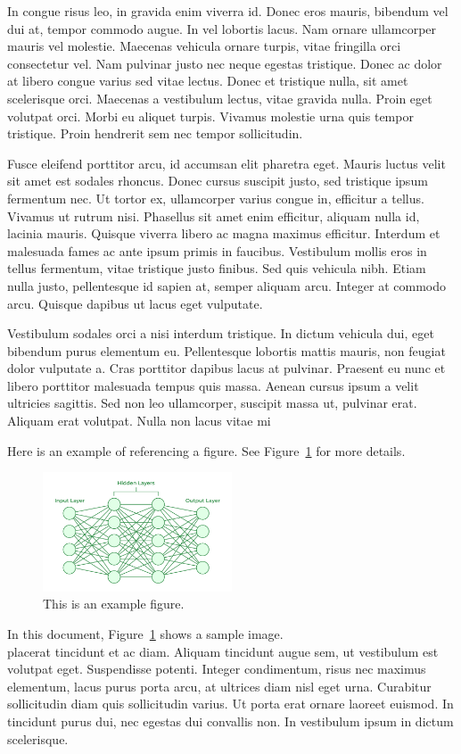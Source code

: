 \documentclass{article}
\begin{document}
In congue risus leo, in gravida enim viverra id. Donec eros mauris, bibendum vel dui at, tempor commodo augue. In vel lobortis lacus. Nam ornare ullamcorper mauris vel molestie. Maecenas vehicula ornare turpis, vitae fringilla orci consectetur vel. Nam pulvinar justo nec neque egestas tristique. Donec ac dolor at libero congue varius sed vitae lectus. Donec et tristique nulla, sit amet scelerisque orci. Maecenas a vestibulum lectus, vitae gravida nulla. Proin eget volutpat orci. Morbi eu aliquet turpis. Vivamus molestie urna quis tempor tristique. Proin hendrerit sem nec tempor sollicitudin.



Fusce eleifend porttitor arcu, id accumsan elit pharetra eget. Mauris luctus velit sit amet est sodales rhoncus. Donec cursus suscipit justo, sed tristique ipsum fermentum nec. Ut tortor ex, ullamcorper varius congue in, efficitur a tellus. Vivamus ut rutrum nisi. Phasellus sit amet enim efficitur, aliquam nulla id, lacinia mauris. Quisque viverra libero ac magna maximus efficitur. Interdum et malesuada fames ac ante ipsum primis in faucibus. Vestibulum mollis eros in tellus fermentum, vitae tristique justo finibus. Sed quis vehicula nibh. Etiam nulla justo, pellentesque id sapien at, semper aliquam arcu. Integer at commodo arcu. Quisque dapibus ut lacus eget vulputate.



Vestibulum sodales orci a nisi interdum tristique. In dictum vehicula dui, eget bibendum purus elementum eu. Pellentesque lobortis mattis mauris, non feugiat dolor vulputate a. Cras porttitor dapibus lacus at pulvinar. Praesent eu nunc et libero porttitor malesuada tempus quis massa. Aenean cursus ipsum a velit ultricies sagittis. Sed non leo ullamcorper, suscipit massa ut, pulvinar erat. Aliquam erat volutpat. Nulla non lacus vitae mi

Here is an example of referencing a figure. See Figure~\ref{fig:example} for more details.

\begin{figure}[h]
    \centering
    \includegraphics[width=0.5\textwidth]{img/Neural-Networks-Architecture} %
    \caption{This is an example figure.}
    \label{fig:example}
\end{figure}
In this document, Figure~\ref{fig:example} shows a sample image.\\
placerat tincidunt et ac diam. Aliquam tincidunt augue sem, ut vestibulum est volutpat eget. Suspendisse potenti. Integer condimentum, risus nec maximus elementum, lacus purus porta arcu, at ultrices diam nisl eget urna. Curabitur sollicitudin diam quis sollicitudin varius. Ut porta erat ornare laoreet euismod. In tincidunt purus dui, nec egestas dui convallis non. In vestibulum ipsum in dictum scelerisque.
\end{document}
